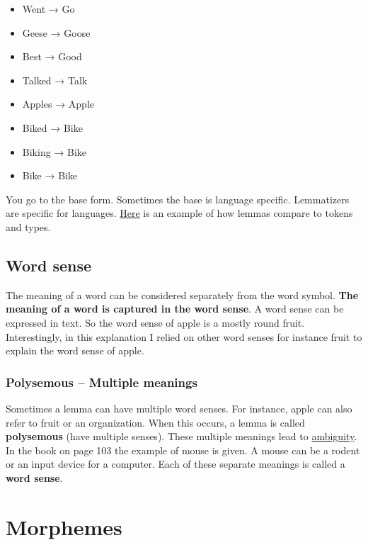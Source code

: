 \documentclass[
  11pt,
  british,
]{article}
\providecommand{\tightlist}{%
  \setlength{\itemsep}{0pt}\setlength{\parskip}{0pt}}
\begin{document}
\begin{itemize}
\tightlist
\item
  Went → Go
\item
  Geese → Goose
\item
  Best → Good
\item
  Talked → Talk
\item
  Apples → Apple
\item
  Biked → Bike
\item
  Biking → Bike
\item
  Bike → Bike
\end{itemize}

You go to the base form. Sometimes the base is language specific.
Lemmatizers are specific for languages. \href{./data.md}{Here} is an
example of how lemmas compare to tokens and types.

\hypertarget{word-sense}{%
\subsection{Word sense}\label{word-sense}}

The meaning of a word can be considered separately from the word symbol.
\textbf{The meaning of a word is captured in the word sense}. A word
sense can be expressed in text. So the word sense of apple is a mostly
round fruit. Interestingly, in this explanation I relied on other word
senses for instance fruit to explain the word sense of apple.

\hypertarget{polysemous-multiple-meanings}{%
\subsubsection{Polysemous -- Multiple
meanings}\label{polysemous-multiple-meanings}}

Sometimes a lemma can have multiple word senses. For instance, apple can
also refer to fruit or an organization. When this occurs, a lemma is
called \textbf{polysemous} (have multiple senses). These multiple
meanings lead to \href{../Languages/Ambiguity.md}{ambiguity}. In the
book on page 103 the example of mouse is given. A mouse can be a rodent
or an input device for a computer. Each of these separate meanings is
called a \textbf{word sense}.

\hypertarget{morphemes}{%
\section{Morphemes}\label{morphemes}}
\end{document}
